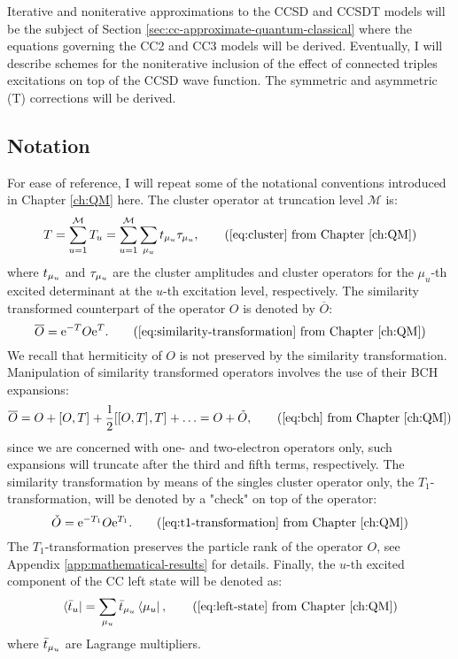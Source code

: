 Iterative and noniterative approximations to the \acrshort{CCSD} and
\acrshort{CCSDT} models will be the subject of Section
\ref{sec:cc-approximate-quantum-classical} where the equations governing
the \acrshort{CC2} and \acrshort{CC3} models will be derived.
Eventually, I will describe schemes for the noniterative inclusion of
the effect of connected triples excitations on top of the
\acrshort{CCSD} wave function.
The symmetric and asymmetric (T) corrections will be derived.

\subsection*{Notation}

For ease of reference, I will repeat some of the notational conventions
introduced in Chapter \ref{ch:QM} here.
The cluster operator at truncation level $\mathcal{M}$ is:
\begin{equation}
  T = \sum_{u=1}^\mathcal{M} T_u =
  \sum_{u=1}^\mathcal{M}\sum_{\mu_u}\tamp{\mu_u}\cluster{\mu_u},
  \tag{\ref{eq:cluster} from Chapter \ref{ch:QM}}
\end{equation}
where $t_{\mu_u}$ and $\tau_{\mu_u}$ are the cluster amplitudes
and cluster operators for the $\mu_u$-th excited determinant at the
$u$-th excitation level, respectively.
The similarity transformed counterpart of the operator $O$ is denoted
by $\overline{O}$:
\begin{equation}
  \overline{O} =\expo{-T}O\expo{T}.
  \tag{\ref{eq:similarity-transformation} from Chapter \ref{ch:QM}}
\end{equation}
We recall that hermiticity of $O$ is not preserved by the similarity
transformation.
Manipulation of similarity transformed operators involves the use of
their \acrlong*{BCH} expansions:
\begin{equation}
  \overline{O}
  =
  O + \BCHfirst{O}{T} + \BCHsecond{O}{T} + \ldots
  =
  O + \tilde{O},
  \tag{\ref{eq:bch} from Chapter \ref{ch:QM}}
\end{equation}
since we are concerned with one- and two-electron operators only,
such expansions will truncate after the third and fifth terms,
respectively.\autocite{Helgaker2000-tz}
The similarity transformation by means of the singles cluster operator
only, \ie the $T_1$-transformation, will be denoted by a "check" on top
of the operator:
\begin{equation}
  \check{O} = \expo{-T_1}O\expo{T_1}.
  \tag{\ref{eq:t1-transformation} from Chapter \ref{ch:QM}}
\end{equation}
The $T_1$-transformation preserves the particle rank of the operator
$O$, see Appendix \ref{app:mathematical-results} for details.
Finally, the $u$-th excited component of the \acrlong*{CC} left state
will be denoted as:
\begin{equation}
  \bra{\tbar{u}} = \sum_{\mu_u}\tbar{\mu_u}\bra{\mu_u},
  \tag{\ref{eq:left-state} from Chapter \ref{ch:QM}}
\end{equation}
where $\bar{t}_{\mu_u}$ are Lagrange multipliers.


